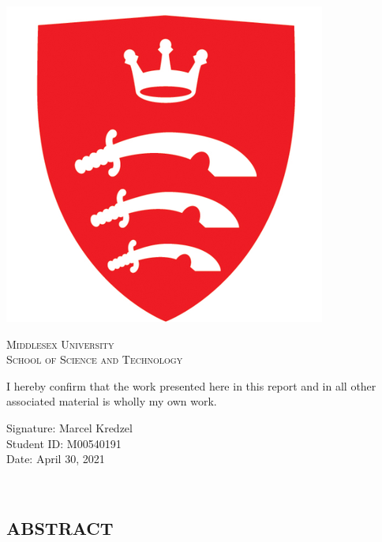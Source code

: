 \documentclass{article}
\begin{document}
\begin{center}
\includegraphics[scale= 0.35]{img/logo.png}
    \bigskip
    
\textsc{\LARGE Middlesex University}\\[1.5cm] 

\textsc{\Large School of Science and Technology}\\[0.5cm]
\end{center}
{\large 
I hereby confirm that the work presented here in this report and in all other
associated material is wholly my own work.\par
}
\vfill\vfill
	\begin{minipage}{0.4\textwidth}
		\begin{flushleft}
			\large
			Signature:
			Marcel Kredzel\\ 
			Student ID: M00540191\\
			Date: April 30, 2021
		\end{flushleft}
	\end{minipage}
	~
	\begin{minipage}{0.4\textwidth}
		\begin{flushright}
		\end{flushright}
	\end{minipage}
	


\newpage
\begin{center}
    \section*{ABSTRACT}
\end{center}
\end{document}
